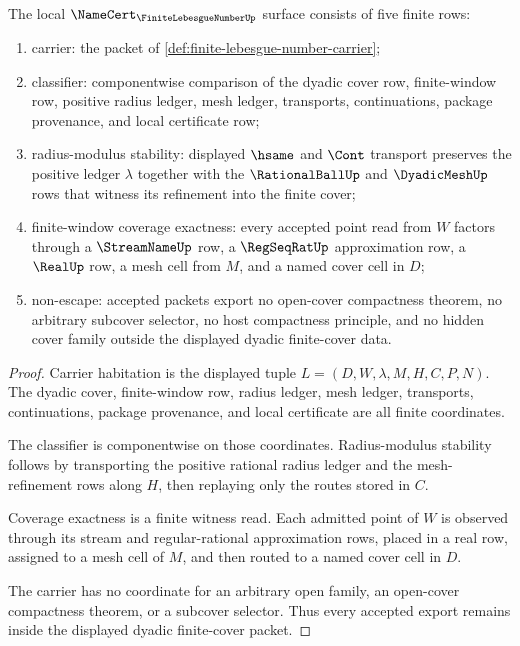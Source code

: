 \begin{theorem}
\label{thm:finite-lebesgue-number-namecert-obligations}
The local $\NameCert_{\FiniteLebesgueNumberUp}$ surface consists of five finite rows:
\begin{enumerate}
\item carrier: the packet of \autoref{def:finite-lebesgue-number-carrier};
\item classifier: componentwise comparison of the dyadic cover row, finite-window row, positive radius ledger, mesh ledger, transports, continuations, package provenance, and local certificate row;
\item radius-modulus stability: displayed $\hsame$ and $\Cont$ transport preserves the positive ledger $\lambda$ together with the $\RationalBallUp$ and $\DyadicMeshUp$ rows that witness its refinement into the finite cover;
\item finite-window coverage exactness: every accepted point read from $W$ factors through a $\StreamNameUp$ row, a $\RegSeqRatUp$ approximation row, a $\RealUp$ row, a mesh cell from $M$, and a named cover cell in $D$;
\item non-escape: accepted packets export no open-cover compactness theorem, no arbitrary subcover selector, no host compactness principle, and no hidden cover family outside the displayed dyadic finite-cover data.
\end{enumerate}
\end{theorem}
\begin{proof}
Carrier habitation is the displayed tuple $L=(D,W,\lambda,M,H,C,P,N)$. The dyadic cover, finite-window row, radius ledger, mesh ledger, transports, continuations, package provenance, and local certificate are all finite coordinates.

The classifier is componentwise on those coordinates. Radius-modulus stability follows by transporting the positive rational radius ledger and the mesh-refinement rows along $H$, then replaying only the routes stored in $C$.

Coverage exactness is a finite witness read. Each admitted point of $W$ is observed through its stream and regular-rational approximation rows, placed in a real row, assigned to a mesh cell of $M$, and then routed to a named cover cell in $D$.

The carrier has no coordinate for an arbitrary open family, an open-cover compactness theorem, or a subcover selector. Thus every accepted export remains inside the displayed dyadic finite-cover packet.
\end{proof}

